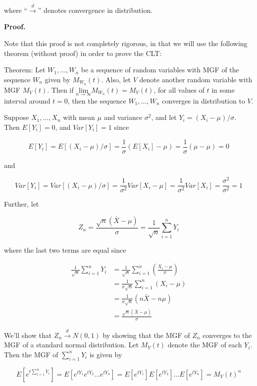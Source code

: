 \documentclass[
  letterpaper,
  DIV=11,
  numbers=noendperiod]{scrreprt}
\begin{document}
where ``\(\overset{d}{\to}\)'' denotes convergence in distribution.

\textbf{Proof.}

Note that this proof is not completely rigorous, in that we will use the
following theorem (without proof) in order to prove the CLT:

Theorem: Let \(W_1, \dots, W_n\) be a sequence of random variables with
MGF of the sequence \(W_n\) given by \(M_{W_n}(t)\). Also, let \(V\)
denote another random variable with MGF \(M_V(t)\). Then if
\(\underset{n \to \infty}{\text{lim}} M_{W_n}(t) = M_V(t)\), for all
values of \(t\) in some interval around \(t = 0\), then the sequence
\(W_1, \dots, W_n\) converges in distribution to \(V\).

Suppose \(X_1, \dots, X_n\) with mean \(\mu\) and variance \(\sigma^2\),
and let \(Y_i = (X_i - \mu)/\sigma\). Then \(E[Y_i] = 0\), and
\(Var[Y_i] = 1\) since

\[
E[Y_i] = E \left[ (X_i - \mu)/\sigma\right] = \frac{1}{\sigma} (E[X_i] - \mu) = \frac{1}{\sigma} (\mu - \mu) = 0
\]

and

\[
Var[Y_i] = Var\left[ (X_i - \mu)/\sigma\right] = \frac{1}{\sigma^2} Var[X_i - \mu] = \frac{1}{\sigma^2} Var[X_i] = \frac{\sigma^2}{\sigma^2} = 1
\]

Further, let

\[
Z_n = \frac{\sqrt{n}(\bar{X} - \mu)}{\sigma} = \frac{1}{\sqrt{n}} \sum_{i = 1}^n Y_i
\]

where the last two terms are equal since

\begin{align*}
    \frac{1}{\sqrt{n}} \sum_{i = 1}^n Y_i & = \frac{1}{\sqrt{n}} \sum_{i = 1}^n \left( \frac{X_i - \mu}{\sigma}\right)\\
    & = \frac{1}{\sigma\sqrt{n}} \sum_{i = 1}^n (X_i - \mu) \\
    & = \frac{1}{\sigma\sqrt{n}}  (n\bar{X} - n\mu) \\
    & = \frac{\sqrt{n}(\bar{X} - \mu)}{\sigma}
\end{align*}

We'll show that \(Z_n \overset{d}{\to} N(0,1)\) by showing that the MGF
of \(Z_n\) converges to the MGF of a standard normal distribution. Let
\(M_Y(t)\) denote the MGF of each \(Y_i\). Then the MGF of
\(\sum_{i = 1}^n Y_i\) is given by

\[
E[e^{t\sum_{i = 1}^n Y_i}] = E[e^{tY_1}e^{tY_2} \dots e^{tY_n}] = E[e^{tY_1}]E[e^{tY_2}] \dots E[e^{tY_n}] = M_Y(t)^n
\]
\end{document}
